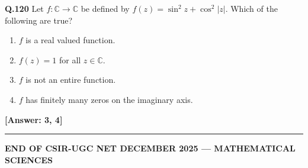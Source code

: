 \documentclass[12pt,a4paper]{article}
\newcommand{\ans}[1]{\quad\textcolor{anscolor}{\textbf{[Answer: #1]}}}
\begin{document}
\textbf{Q.120} Let $f:\mathbb{C}\to\mathbb{C}$ be defined by $f(z)=\sin^2z+\cos^2|z|$. Which of the following are true?
\begin{enumerate}[label=\arabic*.]
\item $f$ is a real valued function.
\item $f(z)=1$ for all $z\in\mathbb{C}$.
\item $f$ is not an entire function.
\item $f$ has finitely many zeros on the imaginary axis.
\end{enumerate}\ans{3, 4}

\vspace{1em}\hrule
\begin{center}
\textbf{END OF CSIR-UGC NET DECEMBER 2025 --- MATHEMATICAL SCIENCES}
\end{center}
\end{document}
